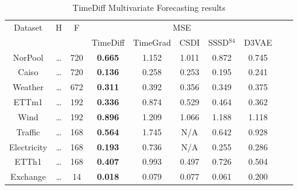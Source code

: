 \begin{table}[ht]
    \centering
    \begin{tabular}{cccccccccc}
        \toprule
        \multirow{2}{*}{Dataset} & \multirow{2}{*}{H} & \multirow{2}{*}{F} & \multicolumn{5}{c}{MSE} \\
        \cmidrule(lr){4-8}
         & & & TimeDiff & TimeGrad & CSDI & SSSD$^{\text{S4}}$ & D3VAE \\
        \midrule
        \multirow{1}{*}{NorPool} & \dots  & 720 & \textbf{0.665} & 1.152 & 1.011 & 0.872 & 0.745 \\
        \midrule
        \multirow{1}{*}{Caiso} & \dots  & 720 & \textbf{0.136} & 0.258 & 0.253 & 0.195 & 0.241 \\
        \midrule
        \multirow{1}{*}{Weather} & \dots  & 672 & \textbf{0.311} & 0.392 & 0.356 & 0.349 & 0.375 \\
        \midrule
        \multirow{1}{*}{ETTm1} & \dots  & 192 & \textbf{0.336} & 0.874 & 0.529 & 0.464 & 0.362 \\
        \midrule
        \multirow{1}{*}{Wind} & \dots  & 192 & \textbf{0.896} & 1.209 & 1.066 & 1.188 & 1.118 \\
        \midrule
        \multirow{1}{*}{Traffic} & \dots  & 168 & \textbf{0.564} & 1.745 & N/A & 0.642 & 0.928 \\
        \midrule
        \multirow{1}{*}{Electricity} & \dots  & 168 & \textbf{0.193} & 0.736 & N/A & 0.255 & 0.286 \\
        \midrule
        \multirow{1}{*}{ETTh1} & \dots  & 168 & \textbf{0.407} & 0.993 & 0.497 & 0.726 & 0.504 \\
        \midrule
        \multirow{1}{*}{Exchange} & \dots  & 14 & \textbf{0.018} & 0.079 & 0.077 & 0.061 & 0.200 \\
        \bottomrule
    \end{tabular}
    \caption{TimeDiff Multivariate Forecasting results \cite{shen_non-autoregressive_2023}}
    \label{tab:timediff-results}
\end{table}

